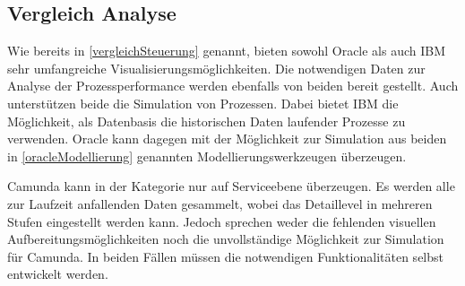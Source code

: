 \subsection{Vergleich Analyse}
Wie bereits in \ref{vergleichSteuerung} genannt, bieten sowohl Oracle als auch IBM sehr umfangreiche Visualisierungsmöglichkeiten. Die notwendigen Daten zur Analyse der Prozessperformance werden ebenfalls von beiden bereit gestellt. Auch unterstützen beide die Simulation von Prozessen. Dabei bietet IBM die Möglichkeit, als Datenbasis die historischen Daten laufender Prozesse zu verwenden. Oracle kann dagegen mit der Möglichkeit zur Simulation aus beiden in \ref{oracleModellierung} genannten Modellierungswerkzeugen überzeugen.  

\smallskip\noindent Camunda kann in der Kategorie nur auf Serviceebene überzeugen. Es werden alle zur Laufzeit anfallenden Daten gesammelt, wobei das Detaillevel in mehreren Stufen eingestellt werden kann. Jedoch sprechen weder die fehlenden visuellen Aufbereitungsmöglichkeiten noch die unvollständige Möglichkeit zur Simulation für Camunda. In beiden Fällen müssen die notwendigen Funktionalitäten selbst entwickelt werden.



